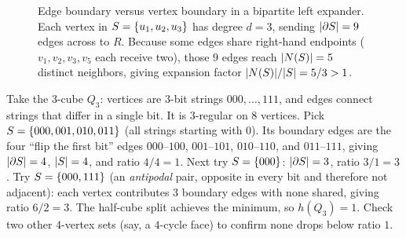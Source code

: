 \begin{figure}[htbp]
\caption{Edge boundary versus vertex boundary in a bipartite left expander. Each vertex in $S=\{u_1,u_2,u_3\}$ has degree $d=3$, sending $\lvert\partial S\rvert=9$ edges across to $R$. Because some edges share right-hand endpoints ($v_1,v_2,v_3,v_5$ each receive two), those $9$ edges reach $\lvert N(S)\rvert=5$ distinct neighbors, giving expansion factor $\lvert N(S)\rvert/\lvert S\rvert=5/3>1$.}
\label{ch34:fig-fanout}
\end{figure}

\begin{labbox}
Take the $3$-cube $Q_3$: vertices are $3$-bit strings $000,\dots,111$, and edges connect strings that differ in a single bit. It is $3$-regular on $8$ vertices. Pick $S=\{000,001,010,011\}$ (all strings starting with $0$). Its boundary edges are the four ``flip the first bit'' edges $000$--$100$, $001$--$101$, $010$--$110$, and $011$--$111$, giving $\lvert\partial S\rvert=4$, $\lvert S\rvert=4$, and ratio $4/4=1$. Next try $S=\{000\}$: $\lvert\partial S\rvert=3$, ratio $3/1=3$. Try $S=\{000,111\}$ (an \emph{antipodal} pair, opposite in every bit and therefore not adjacent): each vertex contributes $3$ boundary edges with none shared, giving ratio $6/2=3$. The half-cube split achieves the minimum, so $h(Q_3)=1$. Check two other $4$-vertex sets (say, a $4$-cycle face) to confirm none drops below ratio $1$.
\end{labbox}


